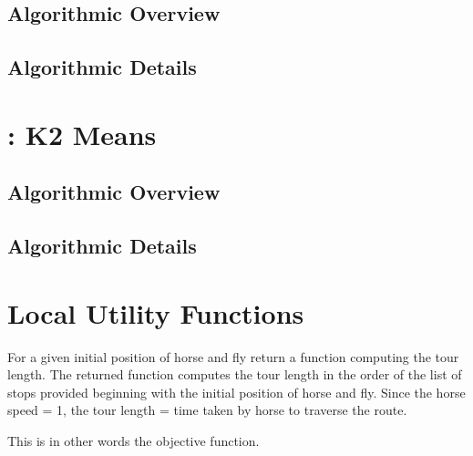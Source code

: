 \documentclass[11.5pt]{report}
\begin{document}
\subsection{Algorithmic Overview}
\subsection{Algorithmic Details}
\section{: K2 Means}  

\subsection{Algorithmic Overview}
\subsection{Algorithmic Details}

\needspace{17cm}
\section{Local Utility Functions}

\newchunk  For a given initial position of horse and fly
   return a function computing the tour length. 
   The returned function computes the tour length 
   in the order of the list of stops provided beginning 
   with the initial position of horse and fly. Since 
   the horse speed = 1, the tour length = time taken 
   by horse to traverse the route.

   This is in other words the objective function. 
\end{document}
